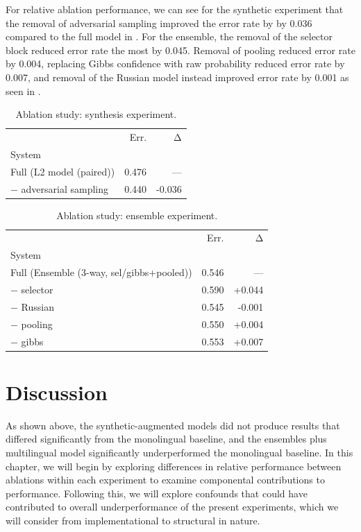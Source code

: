 \documentclass[thesis]{cluu}
\begin{document}
For relative ablation performance, we can see for the synthetic experiment that the removal of adversarial sampling improved the error rate by by 0.036 compared to the full model in . For the ensemble, the removal of the selector block reduced error rate the most by 0.045. Removal of pooling reduced error rate by 0.004, replacing Gibbs confidence with raw probability reduced error rate by 0.007, and removal of the Russian model instead improved error rate by 0.001 as seen in . 

\begin{table}
\centering
\caption{Ablation study: synthesis experiment.}
\label{tab:ablation_synth}
\begin{tabular}{lrr}
\toprule
 & Err. & Δ \\
System &  &  \\
\midrule
Full  (L2 model (paired)) & 0.476 & — \\
− adversarial sampling & 0.440 & -0.036 \\
\bottomrule
\end{tabular}
\end{table}

\begin{table}
\centering
\caption{Ablation study: ensemble experiment.}
\label{tab:ablation_ens}
\begin{tabular}{lrr}
\toprule
 & Err. & Δ \\
System &  &  \\
\midrule
Full  (Ensemble (3-way, sel/gibbs+pooled)) & 0.546 & — \\
− selector & 0.590 & +0.044 \\
− Russian & 0.545 & -0.001 \\
− pooling & 0.550 & +0.004 \\
− gibbs & 0.553 & +0.007 \\
\bottomrule
\end{tabular}
\end{table}

\chapter{Discussion}\label{ch:dis}
As shown above, the synthetic-augmented models did not produce results that differed significantly from the monolingual baseline, and the ensembles plus multilingual model significantly underperformed the monolingual baseline. In this chapter, we will begin by exploring differences in relative performance between ablations within each experiment to examine componental contributions to performance. Following this, we will explore confounds that could have contributed to overall underperformance of the present experiments, which we will consider from implementational to structural in nature.
\end{document}
